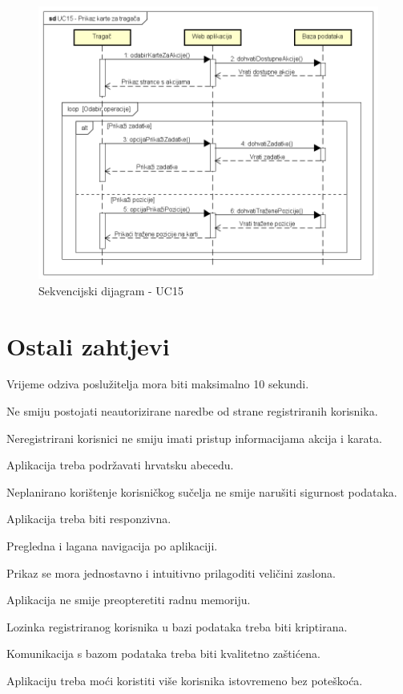 				\begin{figure}[H]
					\includegraphics[scale=0.7]{slike/UC15_sekv.PNG} %
					\centering
					\caption{Sekvencijski dijagram - UC15}
					\label{fig:promjene}
				\end{figure}
	
		\section{Ostali zahtjevi}
		
			 
			 \begin{packed_item}
			 	\item Vrijeme odziva poslužitelja mora biti maksimalno 10 sekundi.
			 	\item Ne smiju postojati neautorizirane naredbe od strane registriranih korisnika.
			 	\item Neregistrirani korisnici ne smiju imati pristup informacijama akcija i karata.
			 	\item Aplikacija treba podržavati hrvatsku abecedu.
			 	\item Neplanirano korištenje korisničkog sučelja ne smije narušiti sigurnost podataka.
			 	\item Aplikacija treba biti responzivna.
			 	\item Pregledna i lagana navigacija po aplikaciji.
			 	\item Prikaz se mora jednostavno i intuitivno prilagoditi veličini zaslona.
			 	\item Aplikacija ne smije preopteretiti radnu memoriju.
			 	\item Lozinka registriranog korisnika u bazi podataka treba biti kriptirana.
			 	\item Komunikacija s bazom podataka treba biti kvalitetno zaštićena.
			 	\item Aplikaciju treba moći koristiti više korisnika istovremeno bez poteškoća.
			 \end{packed_item}
			 
			 
			 
	